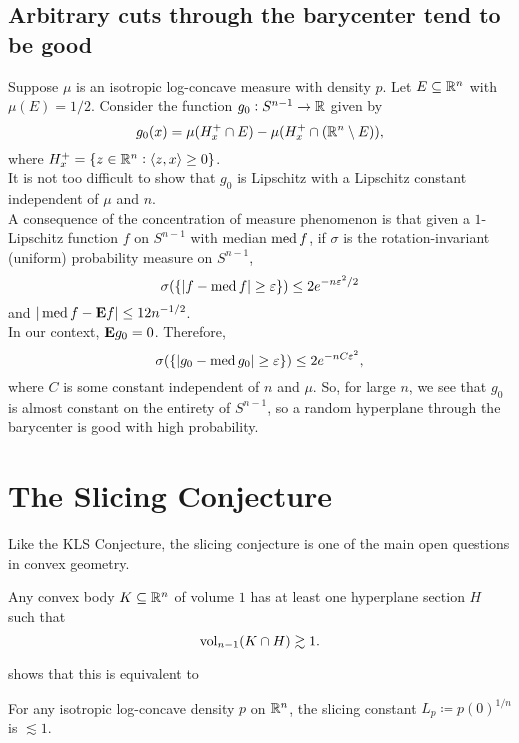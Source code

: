 \documentclass{article}
\begin{document}
	\subsection{Arbitrary cuts through the barycenter tend to be good}


		Suppose $\mu$ is an isotropic log-concave measure with density $p$. Let $E \subseteq \mathbb{R}^n$ with $\mu(E) = 1/2$. Consider the function $g_0 : S^{n-1} \to \mathbb{R}$ given by
		\[ g_0(x) = \mu(H_x^+ \cap E) - \mu(H_x^+ \cap (\mathbb{R}^n\setminus E)), \]
		where $H_x^+ = \{ z \in \mathbb{R}^n : \langle z , x \rangle \geq 0 \}$.\\
		It is not too difficult to show that $g_0$ is Lipschitz with a Lipschitz constant independent of $\mu$ and $n$.\\
		A consequence of the concentration of measure phenomenon is that given a $1$-Lipschitz function $f$ on $S^{n-1}$ with median $\operatorname{med} f$, if $\sigma$ is the rotation-invariant (uniform) probability measure on $S^{n-1}$,
		\[ \sigma ( \{ |f - \operatorname{med} f| \geq \varepsilon \} ) \leq 2e^{-n\varepsilon^2/2} \]
		and $|\operatorname{med} f - \textbf{E} f| \leq 12n^{-1/2}$.\\
		In our context, $\textbf{E} g_0 = 0$. Therefore,
		\[ \sigma ( \{ |g_0 - \operatorname{med} g_0| \geq \varepsilon \} ) \leq 2e^{-nC\varepsilon^2}, \]
		where $C$ is some constant independent of $n$ and $\mu$. So, for large $n$, we see that $g_0$ is almost constant on the entirety of $S^{n-1}$, so a random hyperplane through the barycenter is good with high probability.\\

\section{The Slicing Conjecture}
	
	Like the KLS Conjecture, the slicing conjecture is one of the main open questions in convex geometry.

	\begin{fcon}
		Any convex body $K\subseteq\mathbb{R}^n$ of volume $1$ has at least one hyperplane section $H$ such that
		\[ \operatorname{vol}_{n-1}(K \cap H) \gtrsim 1. \]
	\end{fcon}

	\cite{slicing-conjecture-equivalent} shows that this is equivalent to

	\begin{fcon}
		For any isotropic log-concave density $p$ on $\mathbb{R}^n$, the slicing constant $L_p \coloneqq p(0)^{1/n}$ is $\lesssim 1$.
	\end{fcon}
\end{document}
